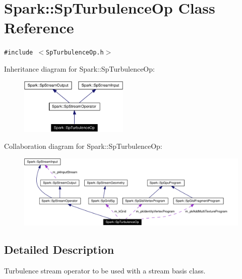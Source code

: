 \section{Spark::Sp\-Turbulence\-Op Class Reference}
\label{classSpark_1_1SpTurbulenceOp}
{\tt \#include $<$Sp\-Turbulence\-Op.h$>$}

Inheritance diagram for Spark::Sp\-Turbulence\-Op:\begin{figure}[H]
\begin{center}
\leavevmode
\includegraphics[width=147pt]{classSpark_1_1SpTurbulenceOp__inherit__graph}
\end{center}
\end{figure}
Collaboration diagram for Spark::Sp\-Turbulence\-Op:\begin{figure}[H]
\begin{center}
\leavevmode
\includegraphics[width=362pt]{classSpark_1_1SpTurbulenceOp__coll__graph}
\end{center}
\end{figure}


\subsection{Detailed Description}
Turbulence stream operator to be used with a stream basis class. 

